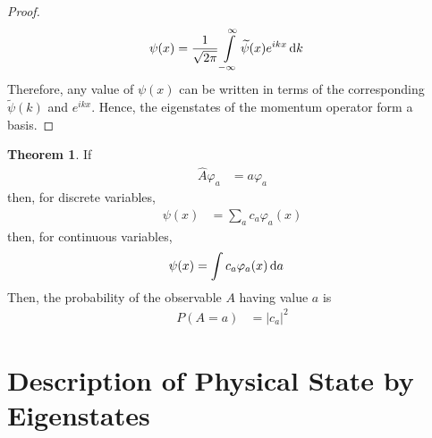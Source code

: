 \documentclass[titlepage, fleqn, a4paper, 12pt, twoside]{article}
\theoremstyle{definition}
\theoremstyle{theorem}
\newtheorem{theorem}{Theorem}
\let\Oldsection\section
\renewcommand{\section}{\FloatBarrier\Oldsection}
\renewcommand{\tilde}{\widetilde}
\begin{document}
\begin{proof}
	\begin{align*}
		\psi(x) &= \frac{1}{\sqrt{2 \pi}} \int\limits_{-\infty}^{\infty} \tilde{\psi}(x) e^{i k x} \dif k
	\end{align*}
	Therefore, any value of $\psi(x)$ can be written in terms of the corresponding $\tilde{\psi}(k)$ and $e^{i k x}$.
	Hence, the eigenstates of the momentum operator form a basis.
\end{proof}

\begin{theorem}
	If
	\begin{align*}
		\hat{A} \varphi_a &= a \varphi_a
	\end{align*}
	then, for discrete variables,
	\begin{align*}
		\psi(x) &= \sum\limits_{a} c_a \varphi_a(x)
	\end{align*}
	then, for continuous variables,
	\begin{align*}
		\psi(x) &= \int c_a \varphi_a(x) \dif a
	\end{align*}
	Then, the probability of the observable $A$ having value $a$ is
	\begin{align*}
		P(A = a) &= \left| c_a \right|^2
	\end{align*}
\end{theorem}

\section{Description of Physical State by Eigenstates}
\end{document}
